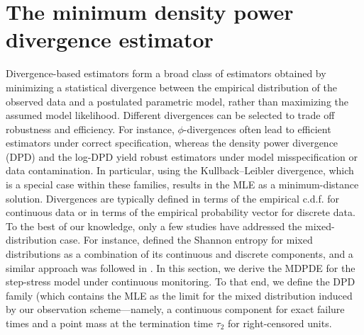 \documentclass{article}
\begin{document}
 \section{The minimum density power divergence estimator \label{sec:MDPDE}}

Divergence-based estimators form a broad class of estimators obtained by minimizing a statistical divergence between the empirical distribution of the observed data and a postulated parametric model, rather than maximizing the assumed model likelihood. Different divergences can be selected to trade off robustness and efficiency. For instance, $\phi$-divergences often lead to efficient estimators under correct specification, whereas the density power divergence (DPD) and the log-DPD yield robust estimators under model misspecification or data contamination. In particular, using the Kullback–Leibler divergence, which is a special case within these  families, results in the MLE as a minimum-distance solution.
Divergences are typically defined in terms of the empirical c.d.f. for continuous data or in terms of the empirical probability vector for discrete data. To the best of our knowledge, only a few studies have addressed the mixed-distribution case. For instance, \cite{Nair2007} defined the Shannon entropy for mixed distributions as a combination of its continuous and discrete components, and a similar approach was followed in \cite{jaenada2025}.
In this section, we derive the MDPDE for the step-stress model under continuous monitoring. To that end, we define the DPD family (which contains the MLE as the limit 
for the mixed distribution induced by our observation scheme—namely, a continuous component for exact failure times and a point mass at the termination time $\tau_2$
for right-censored units.
\end{document}
